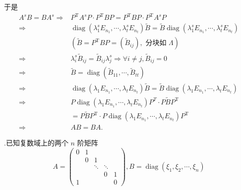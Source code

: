 \documentclass{article}
\begin{document}
于是
$$
    \begin{aligned}
        A^{s} B=B A^{s} \Rightarrow & P^{\mathrm{T}} A^{s} P \cdot P^{\mathrm{T}} B P=P^{\mathrm{T}} B P \cdot P^{\mathrm{T}} A^{s} P                                                                                                               \\
        \Rightarrow                 & \operatorname{diag}\left(\lambda_{1}^{s} E_{n_{1}}, \cdots, \lambda_{t}^{s} E_{n_{t}}\right) \tilde{B}=\tilde{B} \operatorname{diag}\left(\lambda_{1}^{s} E_{n_{1}}, \cdots, \lambda_{t}^{s} E_{n_{t}}\right) \\
                                    & \left(\tilde{B}=P^{\mathrm{T}} B P=\left(\tilde{B}_{i j}\right), \text { 分块如 } \Lambda\right)                                                                                                              \\
        \Rightarrow                 & \lambda_{i}^{s} \tilde{B}_{i j}=\tilde{B}_{i j} \lambda_{j}^{s} \Rightarrow \forall i \neq j, \tilde{B}_{i j}=0                                                                                               \\
        \Rightarrow                 & \tilde{B}=\operatorname{diag}\left(\tilde{B}_{11}, \cdots, \tilde{B}_{t t}\right)                                                                                                                             \\
        \Rightarrow                 & \operatorname{diag}\left(\lambda_{1} E_{n_{1}}, \cdots, \lambda_{t} E_{n_{t}}\right) \tilde{B}=\tilde{B} \operatorname{diag}\left(\lambda_{1} E_{n_{1}}, \cdots, \lambda_{t} E_{n_{t}}\right)                 \\
        \Rightarrow                 & P \operatorname{diag}\left(\lambda_{1} E_{n_{1}}, \cdots, \lambda_{t} E_{n_{t}}\right) P^{T} \cdot P \tilde{B} P^{\mathrm{T}}                                                                                 \\
                                    & =P \tilde{B} P^{\mathrm{T}} \cdot P \operatorname{diag}\left(\lambda_{1} E_{n_{1}}, \cdots, \lambda_{t} E_{n_{t}}\right) P^{\mathrm{T}}                                                                       \\
        \Rightarrow                 & A B=B A .
    \end{aligned}
$$

\vspace{1ex}
{.}已知复数域上的两个 $n$ 阶矩阵
$$
    A=\left(\begin{array}{ccccc}
            0 & 1 &        &        &   \\
              & 0 & 1      &        &   \\
              &   & \ddots & \ddots &   \\
              &   &        & 0      & 1 \\
            1 &   &        &        & 0
        \end{array}\right), B=\operatorname{diag}\left(\xi_{1}, \xi_{2}, \cdots, \xi_{n}\right)
$$
\end{document}
